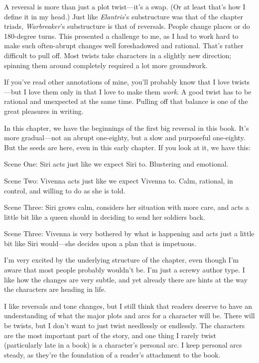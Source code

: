 A reversal is more than just a plot twist—it’s a swap. (Or at least that’s how I define it in my head.) Just like \textit{Elantris}’s substructure was that of the chapter triads, \textit{Warbreaker}’s substructure is that of reversals. People change places or do 180-degree turns. This presented a challenge to me, as I had to work hard to make such often-abrupt changes well foreshadowed and rational. That’s rather difficult to pull off. Most twists take characters in a slightly new direction; spinning them around completely required a lot more groundwork.

If you’ve read other annotations of mine, you’ll probably know that I love twists—but I love them only in that I love to make them \textit{work}. A good twist has to be rational and unexpected at the same time. Pulling off that balance is one of the great pleasures in writing.

In this chapter, we have the beginnings of the first big reversal in this book. It’s more gradual—not an abrupt one-eighty, but a slow and purposeful one-eighty. But the seeds are here, even in this early chapter. If you look at it, we have this:

Scene One: Siri acts just like we expect Siri to. Blustering and emotional.

Scene Two: Vivenna acts just like we expect Vivenna to. Calm, rational, in control, and willing to do as she is told.

Scene Three: Siri grows calm, considers her situation with more care, and acts a little bit like a queen should in deciding to send her soldiers back.

Scene Three: Vivenna is very bothered by what is happening and acts just a little bit like Siri would—she decides upon a plan that is impetuous.

I’m very excited by the underlying structure of the chapter, even though I’m aware that most people probably wouldn’t be. I’m just a screwy author type.
I like how the changes are very subtle, and yet already there are hints at the way the characters are heading in life.

I like reversals and tone changes, but I still think that readers deserve to have an understanding of what the major plots and arcs for a character will be. There will be twists, but I don’t want to just twist needlessly or endlessly. The characters are the most important part of the story, and one thing I rarely twist (particularly late in a book) is a character’s personal arc. I keep personal arcs steady, as they’re the foundation of a reader’s attachment to the book.

